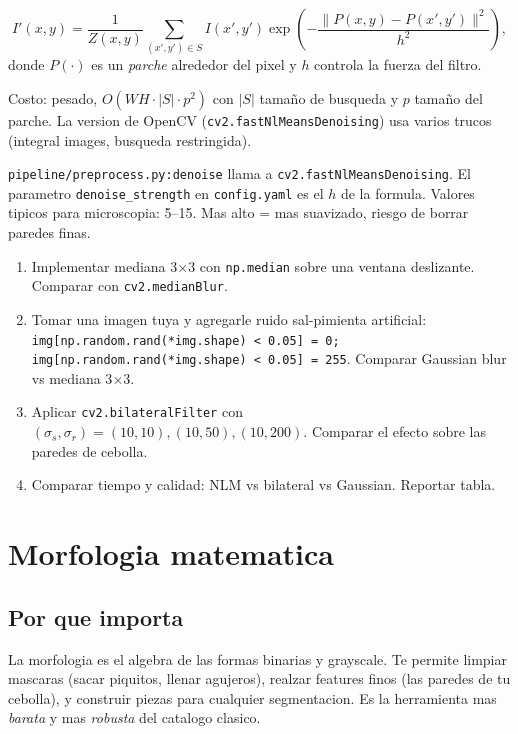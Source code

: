 \documentclass[11pt,a4paper,twoside,openright]{book}
\begin{document}
\begin{equation}
I'(x,y) = \frac{1}{Z(x,y)} \sum_{(x',y') \in S} I(x',y') \exp\!\left(-\frac{\|P(x,y) - P(x',y')\|^2}{h^2}\right),
\end{equation}
donde $P(\cdot)$ es un \emph{parche} alrededor del pixel y $h$ controla la fuerza del filtro.

Costo: pesado, $O(WH \cdot |S| \cdot p^2)$ con $|S|$ tamaño de busqueda y $p$ tamaño del parche. La version de OpenCV (\texttt{cv2.fastNlMeansDenoising}) usa varios trucos (integral images, busqueda restringida).

\begin{pipeline}
\texttt{pipeline/preprocess.py:denoise} llama a \texttt{cv2.fastNlMeansDenoising}. El parametro \texttt{denoise\_strength} en \texttt{config.yaml} es el $h$ de la formula. Valores tipicos para microscopia: 5--15. Mas alto = mas suavizado, riesgo de borrar paredes finas.
\end{pipeline}

\begin{ejercicio}
\begin{enumerate}[leftmargin=2em]
  \item Implementar mediana 3$\times$3 con \texttt{np.median} sobre una ventana deslizante. Comparar con \texttt{cv2.medianBlur}.
  \item Tomar una imagen tuya y agregarle ruido sal-pimienta artificial: \texttt{img[np.random.rand(*img.shape) < 0.05] = 0; img[np.random.rand(*img.shape) < 0.05] = 255}. Comparar Gaussian blur vs mediana 3$\times$3.
  \item Aplicar \texttt{cv2.bilateralFilter} con $(\sigma_s, \sigma_r) = (10, 10), (10, 50), (10, 200)$. Comparar el efecto sobre las paredes de cebolla.
  \item Comparar tiempo y calidad: NLM vs bilateral vs Gaussian. Reportar tabla.
\end{enumerate}
\end{ejercicio}

\chapter{Morfologia matematica}
\label{ch:morfologia}

\section{Por que importa}

La morfologia es el algebra de las formas binarias y grayscale. Te permite limpiar mascaras (sacar piquitos, llenar agujeros), realzar features finos (las paredes de tu cebolla), y construir piezas para cualquier segmentacion. Es la herramienta mas \emph{barata} y mas \emph{robusta} del catalogo clasico.
\end{document}
